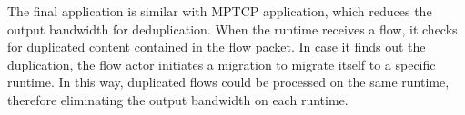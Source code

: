 The final application is similar with MPTCP application, which reduces the output bandwidth for deduplication. When the runtime receives a flow, it checks for duplicated content contained in the flow packet. In case it finds out the duplication, the flow actor initiates a migration to migrate itself to a specific runtime. In this way, duplicated flows could be processed on the same runtime, therefore eliminating the output bandwidth on each runtime.
